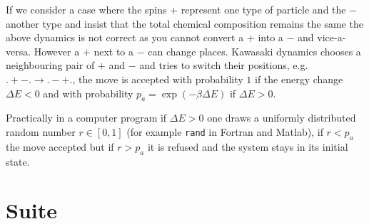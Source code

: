 If we consider a case where the spins $+$ represent one type of particle and the $-$ another type and insist that the total  chemical composition remains the same the above dynamics is not correct as you cannot convert a $+$ into a $-$ and vice-a-versa. However a $+$ next to a $-$ can change places. Kawasaki dynamics chooses a neighbouring pair of $+$ and $-$ and tries to switch their positions, e.g. $.+-.\to .-+.$,  the move is accepted with probability $1$ if the energy change $\Delta E<0$  and with probability $p_a=\exp\left(-\beta\Delta E\right)$ if $\Delta E>0$.

Practically in a computer program if $\Delta E >0$ one draws a uniformly distributed random
number $r\in[0,1]$ (for example {\tt rand} in Fortran and Matlab), if $r< p_a $ the move accepted but if $r>p_a$ it is refused and the system stays in its initial state.



\section{Suite}


